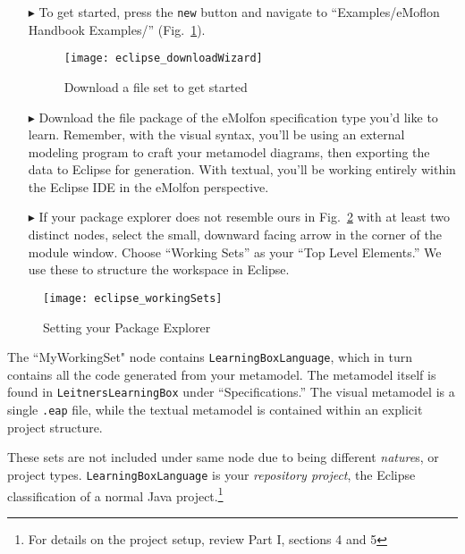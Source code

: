 \begin{itemize}

\item[$\blacktriangleright$] To get started, press the \texttt{new} button and navigate to ``Examples/eMoflon Handbook Examples/''
(Fig.~\ref{fig:downloadWizard}).

\begin{figure}[htbp]
	\centering
  \texttt{[image: eclipse\_downloadWizard]}
	\caption{Download a file set to get started}
	\label{fig:downloadWizard}
\end{figure}

\item[$\blacktriangleright$] Download the file package of the eMolfon specification type you'd like to learn. Remember, with the visual syntax, you'll be
using an external modeling program to craft your metamodel diagrams, then exporting the data to Eclipse for generation. With textual, you'll be working entirely
within the Eclipse IDE in the eMolfon perspective.

\newpage

\vspace*{0.5cm}

\item[$\blacktriangleright$] If your package explorer does not resemble ours in Fig.~\ref{fig:workingSets} with at least two distinct nodes, select the
small, downward facing arrow in the corner of the module window. Choose ``Working Sets'' as your ``Top Level Elements.'' We use these to structure the
workspace in Eclipse.

\vspace{0.75cm}

\end{itemize}

\begin{figure}[htbp]
	\centering
  \texttt{[image: eclipse\_workingSets]}
	\caption{Setting your Package Explorer}
	\label{fig:workingSets}
\end{figure}

The ``MyWorkingSet" node contains \texttt{Learn\-ing\-Box\-Lang\-uage}, which in turn contains all the code generated from your metamodel. The metamodel itself
is found in \texttt{Leit\-ners\-Learn\-ing\-Box} under ``Specifications.'' The visual metamodel is a single \texttt{.eap} file, while the textual metamodel is
contained within an explicit project structure. 

These sets are not included under same node due to being different \emph{nature}s, or project types. \texttt{Learning\-Box\-Language} is your
\emph{repository project}, the Eclipse classification of a normal Java project.\footnote{For details on the project setup, review Part I, sections 4 and 5} 

